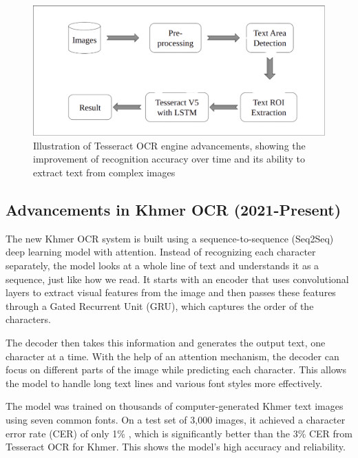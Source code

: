 \begin{figure}[ht]
    \centering
    \includegraphics[width=\textwidth]{figures/Tesseract.png}
    \caption{Illustration of Tesseract OCR engine advancements, showing the improvement 
    of recognition accuracy over time and its ability to extract text from complex images \cite{
    zacharias2020tesseract}}
    \label{fig:tesseract_advancements}
\end{figure}

\subsection{Advancements in Khmer OCR (2021-Present)}
\label{sec:advancements-in-khmer-ocr}

The new Khmer OCR system is built using a sequence-to-sequence (Seq2Seq) 
deep learning model with attention. Instead of recognizing each character separately, 
the model looks at a whole line of text and understands it as a sequence, 
just like how we read. It starts with an encoder that uses convolutional layers 
to extract visual features from the image and then passes these features 
through a Gated Recurrent Unit (GRU), which captures the order of the characters.

The decoder then takes this information and generates the output text, one character 
at a time. With the help of an attention mechanism, the decoder can focus on different 
parts of the image while predicting each character. This allows the model to handle 
long text lines and various font styles more effectively.

The model was trained on thousands of computer-generated Khmer text images using seven 
common fonts. On a test set of 3,000 images, it achieved a character error rate (CER) 
of only 1\% \cite{buoy2021seq2seq}, which is significantly better than the 3\% \cite{buoy2021seq2seq} CER from Tesseract OCR for Khmer. 
This shows the model's high accuracy and reliability.

